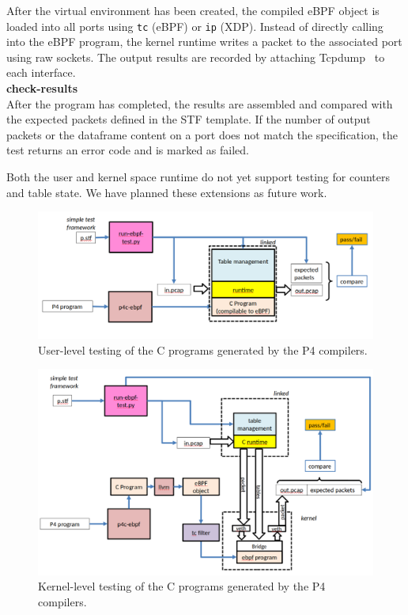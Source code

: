 After the virtual environment has been created, the compiled eBPF object is 
loaded into all ports using \texttt{tc} (eBPF) or \texttt{ip} (XDP). Instead of 
directly calling into the eBPF program, the kernel 
runtime writes a packet to the associated port using raw sockets. The output 
results are recorded by attaching Tcpdump~\cite{tcpdump} to each interface.\\
\textbf{check-results}\\
After the program has completed, the results are assembled and compared with 
the expected packets defined in the STF template. If the number of output 
packets or the dataframe content on a port does not match the specification, 
the test returns an error code and is marked as failed.

Both the user and kernel space runtime do not yet support testing for counters 
and table state. We have planned these extensions as future work.
\begin{figure}
	\centering
	\includegraphics[width=\linewidth]{user_test}
	\caption{User-level testing of the C programs generated by the P4 compilers.}
	\label{fig:user_test}
\end{figure}
\begin{figure}
	\centering
	\includegraphics[width=\linewidth]{kernel_test}
	\caption{Kernel-level testing of the C programs generated by the P4 
	compilers.}
	\label{fig:kernel_test}
\end{figure}
